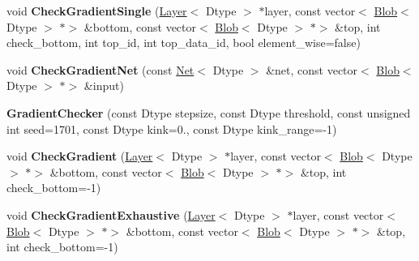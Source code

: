 \begin{DoxyCompactItemize}
\item 
\mbox{\label{classcaffe_1_1_gradient_checker_a660be629d07b8cfdfccd4a29991f3111}} 
void {\bfseries Check\+Gradient\+Single} (\mbox{\hyperlink{classcaffe_1_1_layer}{Layer}}$<$ Dtype $>$ $\ast$layer, const vector$<$ \mbox{\hyperlink{classcaffe_1_1_blob}{Blob}}$<$ Dtype $>$ $\ast$$>$ \&bottom, const vector$<$ \mbox{\hyperlink{classcaffe_1_1_blob}{Blob}}$<$ Dtype $>$ $\ast$$>$ \&top, int check\+\_\+bottom, int top\+\_\+id, int top\+\_\+data\+\_\+id, bool element\+\_\+wise=false)
\item 
\mbox{\label{classcaffe_1_1_gradient_checker_a85a3cbe2fffcb63364c18599e8ba0749}} 
void {\bfseries Check\+Gradient\+Net} (const \mbox{\hyperlink{classcaffe_1_1_net}{Net}}$<$ Dtype $>$ \&net, const vector$<$ \mbox{\hyperlink{classcaffe_1_1_blob}{Blob}}$<$ Dtype $>$ $\ast$$>$ \&input)
\item 
\mbox{\label{classcaffe_1_1_gradient_checker_a3669e5cf7ba11ee6858f628f7409fbdc}} 
{\bfseries Gradient\+Checker} (const Dtype stepsize, const Dtype threshold, const unsigned int seed=1701, const Dtype kink=0., const Dtype kink\+\_\+range=-\/1)
\item 
\mbox{\label{classcaffe_1_1_gradient_checker_adaf5d466ad7e96ec277e7a98ec8b8e68}} 
void {\bfseries Check\+Gradient} (\mbox{\hyperlink{classcaffe_1_1_layer}{Layer}}$<$ Dtype $>$ $\ast$layer, const vector$<$ \mbox{\hyperlink{classcaffe_1_1_blob}{Blob}}$<$ Dtype $>$ $\ast$$>$ \&bottom, const vector$<$ \mbox{\hyperlink{classcaffe_1_1_blob}{Blob}}$<$ Dtype $>$ $\ast$$>$ \&top, int check\+\_\+bottom=-\/1)
\item 
\mbox{\label{classcaffe_1_1_gradient_checker_ae485f015c92c3617e8ed2344ca95c347}} 
void {\bfseries Check\+Gradient\+Exhaustive} (\mbox{\hyperlink{classcaffe_1_1_layer}{Layer}}$<$ Dtype $>$ $\ast$layer, const vector$<$ \mbox{\hyperlink{classcaffe_1_1_blob}{Blob}}$<$ Dtype $>$ $\ast$$>$ \&bottom, const vector$<$ \mbox{\hyperlink{classcaffe_1_1_blob}{Blob}}$<$ Dtype $>$ $\ast$$>$ \&top, int check\+\_\+bottom=-\/1)
\item 
\mbox{\label{classcaffe_1_1_gradient_checker_a0f54fe63f95aa3d1687219097332278b}} 
$$
\end{DoxyCompactItemize}

